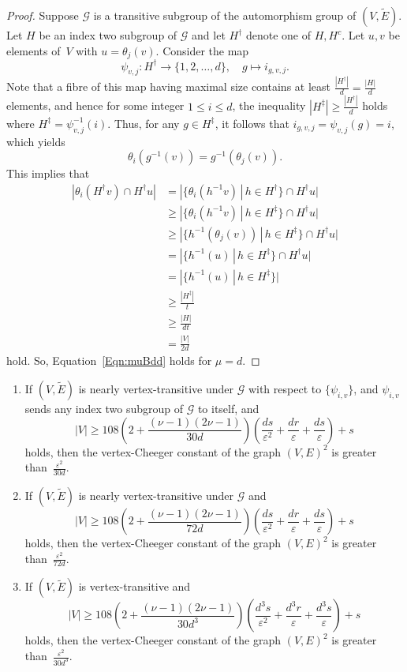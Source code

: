 \documentclass[ALCO,Unicode,published]{cedram}
\newcommand{\mo}{{-1}}
\newcommand{\calG}{\ensuremath{\mathcal{G}}}
\begin{document}
\begin{proof}
Suppose $\calG$ is a transitive subgroup of the automorphism group of $(V, \widetilde E)$. Let $H$ be an index two subgroup of $\calG$ and let $H^\dag$ denote one of $H, H^c$. Let $u,v$ be elements of~$V$ with $u = \theta_j(v)$. Consider the map 
$$\psi_{v, j} : H^\dag \to \{1, 2, \ldots, d\},\quad
g \mapsto i_{g, v, j}.$$
Note that a fibre of this map having maximal size contains at least $\frac {|H^\dag|}d = \frac{|H|}d$ elements, and hence for some integer $1\leq i \leq d$, the inequality $|H^\ddag  |\geq \frac {|H^\dag|}d$ holds where $H^\ddag = \psi_{v, j}^\mo(i)$. Thus, for any $g\in H^\ddag$, it follows that $i_{g, v, j} = \psi_{v, j}(g) = i$, which yields 
\[\theta_i(g^\mo(v)) = g^\mo (\theta_j (v)) .\]
This implies that 
\begin{align*}
|\theta_{i} (H^\dag v) \cap H^\dag u|
& = |\{\theta_{i}(h^\mo v) \,|\, h\in H^\dag\}\cap H^\dag u|\\
& \geq |\{\theta_{i}(h^\mo v) \,|\, h\in H^\ddag\}\cap H^\dag u|\\
& \geq |\{h^\mo (\theta_j(v)) \,|\, h\in H^\ddag\}\cap H^\dag u|\\
& = |\{h^\mo (u) \,|\, h\in H^\ddag\}\cap H^\dag u|\\
& = |\{h^\mo (u) \,|\, h\in H^\ddag\}|\\
& \geq \frac{|H^\ddag|}{t} \\
& \geq \frac{|H|}{dt}\\
& = \frac{|V|}{2d}
\end{align*}
hold. So, Equation~\eqref{Eqn:muBdd} holds for $\mu = d$. 
\end{proof}

\begin{theorem}\label{Thm:SpannSubgraVertexTra}
\quad
\begin{enumerate}
\item 
If $(V, \widetilde E)$ is nearly vertex-transitive under $\calG$ with respect to $\{\psi_{i,v}\}$, and $\psi_{i, v}$ sends any index two subgroup of $\calG$ to itself, and 
$$
|V| 
 \geq 
108
\left( 2 + \frac {(\nu-1)(2\nu -1)} {30d}  \right)  
\left( \frac{ds}{\varepsilon^2} + \frac{dr}\varepsilon +\frac{ds}{\varepsilon}\right) + s 
$$
holds, 
then the vertex-Cheeger constant of the graph $(V, E)^2$ is greater than~$\frac{\varepsilon^{2}}{30d}$. 

\item 
If $(V, \widetilde E)$ is nearly vertex-transitive under $\calG$ and 
$$
|V| 
 \geq 
108
\left( 2 + \frac {(\nu-1)(2\nu -1)}  {72d} \right)  
\left( \frac{ds}{\varepsilon^2} + \frac{dr}\varepsilon +\frac{ds}{\varepsilon}\right) + s 
$$
holds, then the vertex-Cheeger constant of the graph $(V, E)^2$ is greater than~$\frac{\varepsilon^{2}}{72d}$. 
\item 
If $(V, \widetilde E)$ is vertex-transitive and 
$$
|V| 
 \geq 
108
\left( 2 + \frac {(\nu-1)(2\nu -1)}  {30d^3} \right)  
\left( \frac{d^3s}{\varepsilon^2} + \frac{d^3r}\varepsilon+ \frac{d^{3}s}{\varepsilon}\right) + s
$$
holds, then the vertex-Cheeger constant of the graph $(V, E)^2$ is greater than~$ \frac{\varepsilon^{2}}{30d^3}$. 
\end{enumerate}
\end{theorem}
\end{document}
